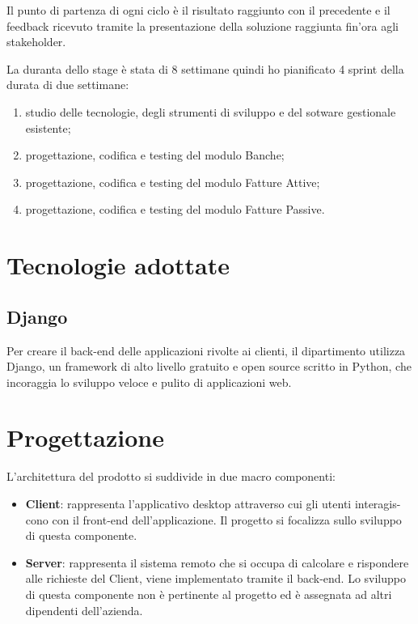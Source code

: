 	Il punto di partenza di ogni ciclo è il risultato raggiunto con il precedente e il feedback
	ricevuto tramite la presentazione della soluzione raggiunta fin’ora agli stakeholder.
	
	La duranta dello stage è stata di 8 settimane quindi ho pianificato 4 sprint della durata di due settimane:
	\begin{enumerate}
		\item studio delle tecnologie, degli strumenti di sviluppo e del sotware gestionale esistente;
		\item progettazione, codifica e testing del modulo Banche;
		\item progettazione, codifica e testing del modulo Fatture Attive;
		\item progettazione, codifica e testing del modulo Fatture Passive.
	\end{enumerate}
			

\section{Tecnologie adottate}

	\subsection{Django}
		Per creare il back-end delle applicazioni rivolte ai clienti, il dipartimento utilizza Django,
		un framework di alto livello gratuito e open source scritto in Python, che incoraggia lo
		sviluppo veloce e pulito di applicazioni web.
	

\section{Progettazione}
	L’architettura del prodotto si suddivide in due macro componenti:
	\begin{itemize}
		\item \textbf{Client}: rappresenta l’applicativo desktop attraverso cui gli utenti interagis-
		cono con il front-end dell’applicazione. Il progetto si focalizza sullo sviluppo
		di questa componente.
		\item \textbf{Server}: rappresenta il sistema remoto che si occupa di calcolare e rispondere
		alle richieste del Client, viene implementato tramite il back-end. Lo sviluppo
		di questa componente non è pertinente al progetto ed è assegnata ad altri
		dipendenti dell’azienda.
	\end{itemize}

